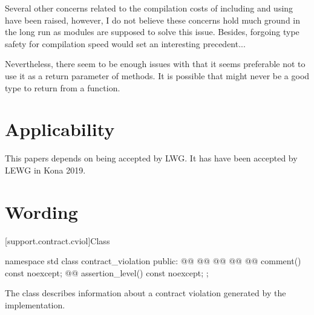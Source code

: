 \documentclass{wg21}
\begin{document}
Several other concerns related to the compilation costs of including and using  have been raised, however, I do not believe these concerns hold much ground in the long run as modules are supposed to solve this issue.
Besides, forgoing type safety for compilation speed would set an interesting precedent...

Nevertheless, there seem to be enough issues with  that it seems
preferable not to use it as a return parameter of  methods.
It is possible that  might never be a good type to return from a function.





\section{Applicability}

This papers depends on \cite{P1208} being accepted by LWG.
It has have been accepted by LEWG in Kona 2019.

\section{Wording}

[support.contract.cviol]{Class }
%

\begin{codeblock}
	namespace std {
		class contract_violation {
			public:
			@@
			@@
			@@
			@@
			@@ comment() const noexcept;
			@@ assertion_level() const noexcept;
		};
	}
\end{codeblock}

\pnum
The class  describes information about
a contract violation generated by the implementation.
\end{document}
